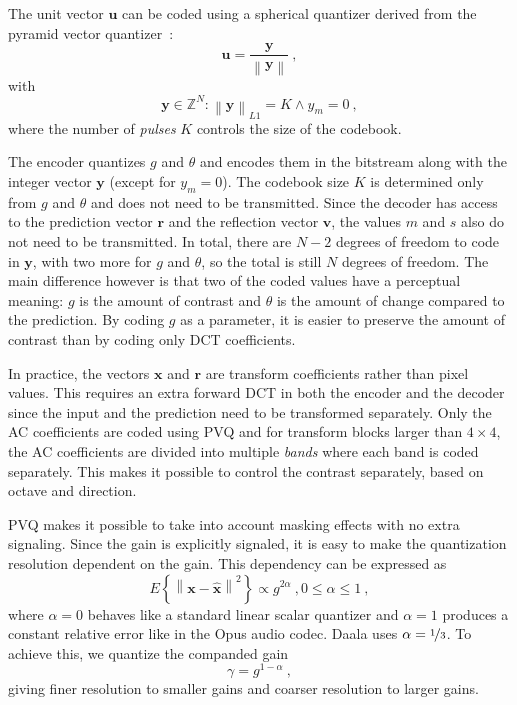 \documentclass[english,conference,10pt]{IEEEtran}
\begin{document}
The unit vector $\mathbf{u}$ can be coded using a spherical quantizer derived
from the pyramid vector quantizer~\cite{Fischer1986}:
\begin{equation}
\mathbf{u}=\frac{\mathbf{y}}{\left\|\mathbf{y}\right\|}\ ,
\end{equation}
with
\begin{equation}
\mathbf{y} \in \mathbb{Z}^N : \left\|\mathbf{y}\right\|_{L1} = K \land y_m=0\ ,
\end{equation}
where the number of \textit{pulses} $K$ controls the size of the codebook.

The encoder quantizes $g$ and $\theta$ and encodes them in the bitstream along
with the integer vector $\mathbf{y}$ (except for $y_m=0$). The codebook
size $K$ is determined only from $g$ and $\theta$ and does not need to be
transmitted. Since the decoder has access to the prediction vector $\mathbf{r}$
and the reflection vector $\mathbf{v}$, the values $m$ and $s$ also do not
need to
be transmitted. In total, there are $N-2$ degrees of freedom to code in
$\mathbf{y}$, with two more for $g$ and $\theta$, so the total is still
$N$ degrees of freedom. The main difference however is that two of the
coded values have a perceptual meaning: $g$ is the amount of contrast and
$\theta$ is the amount of change compared to the prediction. By coding $g$
as a parameter, it is easier to preserve the amount of contrast than by
coding only DCT coefficients.

In practice, the vectors $\mathbf{x}$ and $\mathbf{r}$ are transform
coefficients rather than pixel values. This requires an extra forward DCT
in both the encoder and the decoder since the input and the prediction need
to be transformed separately. Only the AC coefficients are coded using PVQ
and for transform blocks larger than $4\times 4$, the AC coefficients are divided into multiple
\textit{bands} where each band is coded separately. This makes it possible
to control the contrast separately, based on octave and direction.

PVQ makes it possible to take into account masking effects with no
extra signaling. Since the gain is explicitly signaled, it is easy to make
the quantization resolution dependent on the gain. This dependency can be
expressed as
\begin{equation}
E\left\lbrace \left\| \mathbf{x} - \hat{\mathbf{x}} \right\|^2 \right\rbrace
\propto g^{2\alpha}\ , 0 \leq \alpha \leq 1\ ,
\end{equation}
where $\alpha=0$ behaves like a standard linear scalar quantizer and
$\alpha=1$ produces a constant relative error like in the Opus audio codec.
Daala uses $\alpha = \nicefrac{1}{3}$. To achieve this, we quantize the
companded gain
\begin{equation}
\gamma = g^{1-\alpha}\ ,
\end{equation}
giving finer resolution to smaller gains and coarser resolution to larger
gains.
\end{document}
